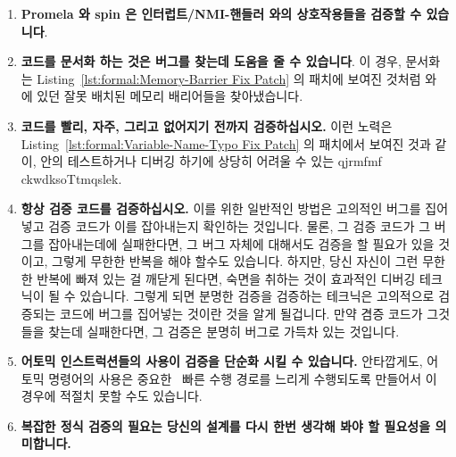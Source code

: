 \begin{enumerate}
\item	{\bf Promela 와 spin 은 인터럽트/NMI-핸들러 와의 상호작용들을 검증할 수
	있습니다}.
\item	{\bf 코드를 문서화 하는 것은 버그를 찾는데 도움을 줄 수 있습니다}.
	이 경우, 문서화는
	Listing~\ref{lst:formal:Memory-Barrier Fix Patch} 의 패치에 보여진
	것처럼  와  에 있던 잘못
	배치된 메모리 배리어들을 찾아냈습니다.
\item	{\bf 코드를 빨리, 자주, 그리고 없어지기 전까지 검증하십시오.}
	이런 노력은
	Listing~\ref{lst:formal:Variable-Name-Typo Fix Patch} 의 패치에서 보여진
	것과 같이,  안의 테스트하거나
	디버깅 하기에 상당히 어려울 수 있는 qjrmfmf ckwdksoTtmqslek.
\iffalse

\item	{\bf Promela and spin can verify interrupt/NMI-handler
	interactions}.
\item	{\bf Documenting code can help locate bugs}.
	In this case, the documentation effort located
	a misplaced memory barrier in
	\co{rcu_enter_nohz()} and \co{rcu_exit_nohz()},
	as shown by the patch in
	Listing~\ref{lst:formal:Memory-Barrier Fix Patch}.
\item	{\bf Validate your code early, often, and up to the point
	of destruction.}
	This effort located one subtle bug in
	\co{rcu_try_flip_waitack_needed()}
	that would have been quite difficult to test or debug, as
	shown by the patch in
	Listing~\ref{lst:formal:Variable-Name-Typo Fix Patch}.
\fi
\item	{\bf 항상 검증 코드를 검증하십시오.}
	이를 위한 일반적인 방법은 고의적인 버그를 집어넣고 검증 코드가 이를
	잡아내는지 확인하는 것입니다.
	물론, 그 검증 코드가 그 버그를 잡아내는데에 실패한다면, 그 버그 자체에
	대해서도 검증을 할 필요가 있을 것이고, 그렇게 무한한 반복을 해야 할수도
	있습니다.
	하지만, 당신 자신이 그런 무한한 반복에 빠져 있는 걸 깨닫게 된다면,
	숙면을 취하는 것이 효과적인 디버깅 테크닉이 될 수 있습니다.
	그렇게 되면 분명한 검증을 검증하는 테크닉은 고의적으로 검증되는 코드에
	버그를 집어넣는 것이란 것을 알게 될겁니다.
	만약 겸증 코드가 그것들을 찾는데 실패한다면, 그 검증은 분명히 버그로
	가득차 있는 것입니다.
\item	{\bf 어토믹 인스트럭션들의 사용이 검증을 단순화 시킬 수 있습니다.}
	안타깝게도,  어토믹 명령어의 사용은 중요한 \IRQ\ 빠른 수행
	경로를 느리게 수행되도록 만들어서 이 경우에 적절치 못할 수도 있습니다.
\item	{\bf 복잡한 정식 검증의 필요는 당신의 설계를 다시 한번 생각해 봐야 할
	필요성을 의미합니다.}
\iffalse


\end{enumerate}
